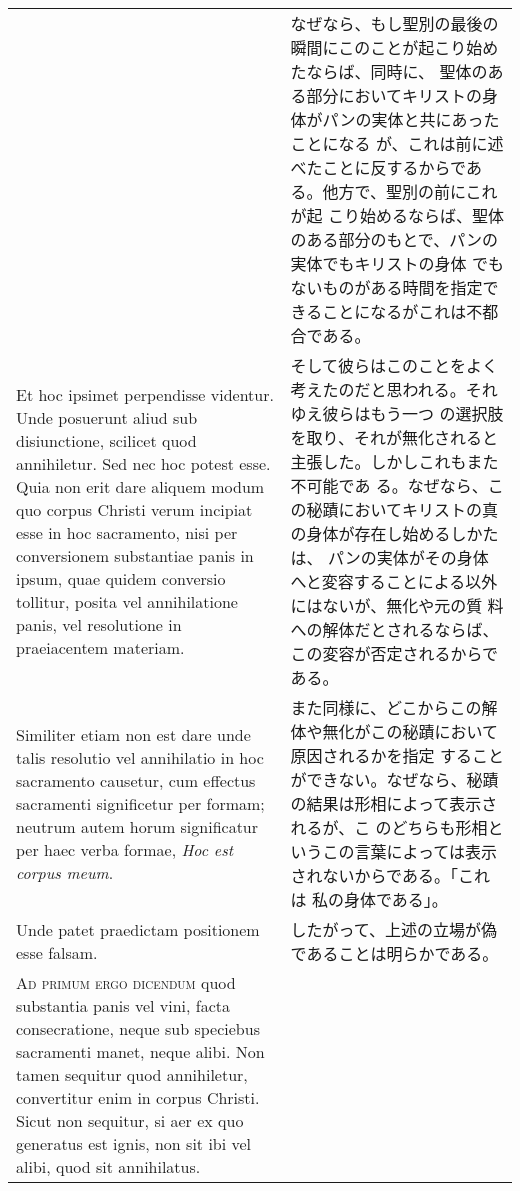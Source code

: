 \documentclass[10pt]{jsarticle} %
\begin{document}
\begin{longtable}{p{21em}p{21em}}
&

なぜなら、もし聖別の最後の瞬間にこのことが起こり始めたならば、同時に、
聖体のある部分においてキリストの身体がパンの実体と共にあったことになる
が、これは前に述べたことに反するからである。他方で、聖別の前にこれが起
こり始めるならば、聖体のある部分のもとで、パンの実体でもキリストの身体
でもないものがある時間を指定できることになるがこれは不都合である。

\\




Et hoc ipsimet perpendisse videntur. Unde posuerunt aliud sub
disiunctione, scilicet quod annihiletur. Sed nec hoc potest esse. Quia
non erit dare aliquem modum quo corpus Christi verum incipiat esse in
hoc sacramento, nisi per conversionem substantiae panis in ipsum, quae
quidem conversio tollitur, posita vel annihilatione panis, vel
resolutione in praeiacentem materiam.


&

そして彼らはこのことをよく考えたのだと思われる。それゆえ彼らはもう一つ
の選択肢を取り、それが無化されると主張した。しかしこれもまた不可能であ
る。なぜなら、この秘蹟においてキリストの真の身体が存在し始めるしかたは、
パンの実体がその身体へと変容することによる以外にはないが、無化や元の質
料への解体だとされるならば、この変容が否定されるからである。


\\

Similiter etiam non est dare unde talis resolutio vel annihilatio in
hoc sacramento causetur, cum effectus sacramenti significetur per
formam; neutrum autem horum significatur per haec verba formae,
{\itshape Hoc est corpus meum}.


&

また同様に、どこからこの解体や無化がこの秘蹟において原因されるかを指定
することができない。なぜなら、秘蹟の結果は形相によって表示されるが、こ
のどちらも形相というこの言葉によっては表示されないからである。「これは
私の身体である」。

\\



Unde patet praedictam positionem esse falsam.

&

したがって、上述の立場が偽であることは明らかである。

\\

{\scshape Ad primum ergo dicendum} quod substantia panis vel vini,
facta consecratione, neque sub speciebus sacramenti manet, neque
alibi. Non tamen sequitur quod annihiletur, convertitur enim in corpus
Christi. Sicut non sequitur, si aer ex quo generatus est ignis, non
sit ibi vel alibi, quod sit annihilatus.


\end{longtable}
\end{document}
